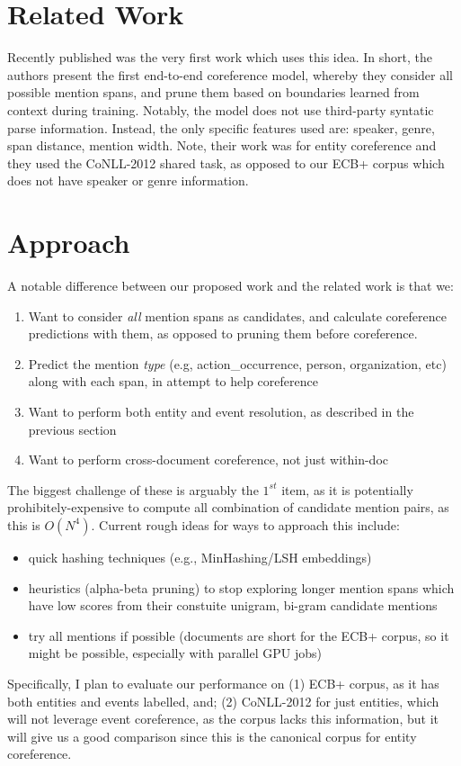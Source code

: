 \section{Related Work}
Recently published \cite{D17-1018} was the very first work which uses this idea.  In short, the authors present the first end-to-end coreference model, whereby they consider all possible mention spans, and prune them based on boundaries learned from context during training.  Notably, the model does not use third-party syntatic parse information.  Instead, the only specific features used are: speaker, genre, span distance, mention width.  Note, their work was for entity coreference and they used the CoNLL-2012 shared task, as opposed to our ECB+ corpus which does not have speaker or genre information.

\section{Approach}
A notable difference between our proposed work and the related work \cite{D17-1018} is that we:
\begin{enumerate}
\item Want to consider \textit{all} mention spans as candidates, and calculate coreference predictions with them, as opposed to pruning them before coreference.
\item Predict the mention \textit{type} (e.g, action\_occurrence, person, organization, etc) along with each span, in attempt to help coreference
\item Want to perform both entity and event resolution, as described in the previous section
\item Want to perform cross-document coreference, not just within-doc
\end{enumerate}

The biggest challenge of these is arguably the $1^{st}$ item, as it is potentially prohibitely-expensive to compute all combination of candidate mention pairs, as this is $O(N^{4})$.  Current rough ideas for ways to approach this include:
\begin{itemize}
\item quick hashing techniques (e.g., MinHashing/LSH embeddings)
\item heuristics (alpha-beta pruning) to stop exploring longer mention spans which have low scores from their constuite unigram, bi-gram candidate mentions
\item try all mentions if possible (documents are short for the ECB+ corpus, so it might be possible, especially with parallel GPU jobs)
\end{itemize}

Specifically, I plan to evaluate our performance on (1) ECB+ corpus, as it has both entities and events labelled, and; (2) CoNLL-2012 for just entities, which will not leverage event coreference, as the corpus lacks this information, but it will give us a good comparison since this is the canonical corpus for entity coreference.